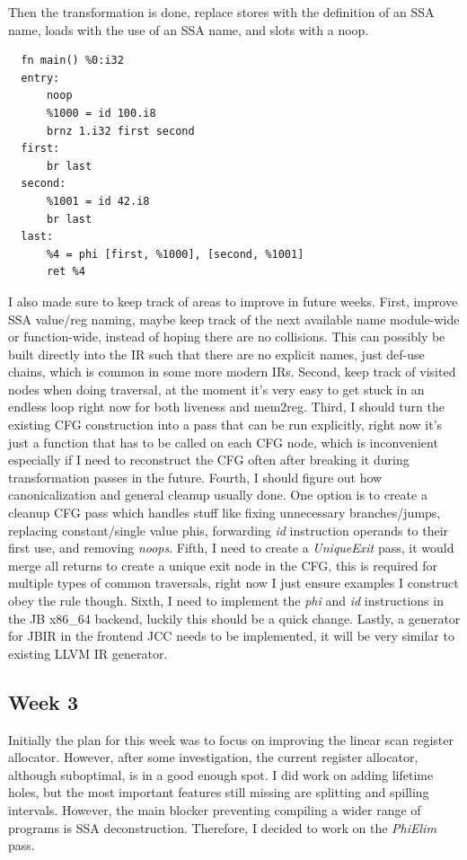 \documentclass[11pt, a4paper, titlepage]{article}
\begin{document}
Then the transformation is done, replace stores with the definition of an SSA name, loads with the use of an SSA name, and slots with a noop. 

\begin{lstlisting}
  fn main() %0:i32
  entry:
      noop
      %1000 = id 100.i8
      brnz 1.i32 first second
  first:
      br last
  second:
      %1001 = id 42.i8
      br last
  last:
      %4 = phi [first, %1000], [second, %1001]
      ret %4
\end{lstlisting}

I also made sure to keep track of areas to improve in future weeks.
First, improve SSA value/reg naming, maybe keep track of the next available name module-wide or function-wide,
instead of hoping there are no collisions.
This can possibly be built directly into the IR such that there are no explicit names,
just def-use chains, which is common in some more modern IRs.
Second, keep track of visited nodes when doing traversal,
at the moment it's very easy to get stuck in an endless loop right now for both liveness and mem2reg.
Third, I should turn the existing CFG construction into a pass that can be run explicitly,
right now it's just a function that has to be called on each CFG node,
which is inconvenient especially if I need to reconstruct the CFG often after breaking it during transformation passes in the future.
Fourth, I should figure out how canonicalization and general cleanup usually done.
One option is to create a cleanup CFG pass which handles stuff like fixing unnecessary branches/jumps,
replacing constant/single value phis, forwarding \textit{id} instruction operands to their first use, and removing \textit{noops}.
Fifth, I need to create a \textit{UniqueExit} pass, it would merge all returns to create a unique exit node in the CFG, this is required for multiple types of common traversals,
right now I just ensure examples I construct obey the rule though.
Sixth, I need to implement the \textit{phi} and \textit{id} instructions in the JB x86\_64 backend,
luckily this should be a quick change.
Lastly, a generator for JBIR in the frontend JCC needs to be implemented,
it will be very similar to existing LLVM IR generator.

\subsection{Week 3}

Initially the plan for this week was to focus on improving the linear scan register allocator.
However, after some investigation, the current register allocator, although suboptimal, is in a good enough spot.
I did work on adding lifetime holes, but the most important features still missing are splitting and spilling intervals.
However, the main blocker preventing compiling a wider range of programs is SSA deconstruction.
Therefore, I decided to work on the \textit{PhiElim} pass.
\end{document}
